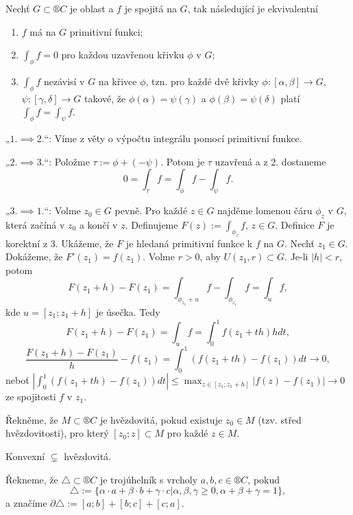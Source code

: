 \documentclass[12pt]{article}					%
\begin{document}
\begin{veta}
	Nechť $G \subset ®C$ je oblast a $f$ je spojitá na $G$, tak následující je ekvivalentní
	\begin{enumerate}
		\item $f$ má na $G$ primitivní funkci;
		\item $\int_\phi f = 0$ pro každou uzavřenou křivku $\phi$ v $G$;
		\item $\int_\phi f$ nezávisí v $G$ na křivce $\phi$, tzn. pro každé dvě křivky $\phi: [\alpha, \beta] \rightarrow G$, $\psi: [\gamma, \delta] \rightarrow G$ takové, že $\phi(\alpha) = \psi(\gamma)$ a $\phi(\beta) = \psi(\delta)$ platí $\int_\phi f = \int_\psi f$.
	\end{enumerate}

	\begin{dukazin}
		„$1. \implies 2.$“: Víme z věty o výpočtu integrálu pomocí primitivní funkce.

		„$2. \implies 3.$“: Položme $\tau := \phi + (- \psi)$. Potom je $\tau$ uzavřená a z 2. dostaneme
		$$ 0 = \int_\tau f = \int_\phi f - \int_\psi f. $$

		„$3. \implies 1.$“: Volme $z_0 \in G$ pevně. Pro každé $z \in G$ najděme lomenou čáru $\phi_z$ v $G$, která začíná v $z_0$ a končí v $z$. Definujeme $F(z) := \int_{\phi_z} f$, $z \in G$. Definice $F$ je korektní z 3. Ukážeme, že $F$ je hledaná primitivní funkce k $f$ na $G$. Nechť $z_1 \in G$. Dokážeme, že $F'(z_1) = f(z_1)$. Volme $r > 0$, aby $U(z_1, r) \subset G$. Je-li $|h| < r$, potom
		$$ F(z_1 + h) - F(z_1) = \int_{\phi_{z_1} + u} f - \int_{\phi_{z_1}} f = \int_u f, $$
		kde $u = [z_1; z_1 + h]$ je úsečka. Tedy
		$$ F(z_1 + h) - F(z_1) = \int_u f = \int_0^1 f(z_1 + th)h dt, $$
		$$ \frac{F(z_1 + h) - F(z_1)}{h} - f(z_1) = \int_0^1 (f(z_1 + th) - f(z_1))dt \rightarrow 0, $$
		neboť $\left|\int_0^1 (f(z_1 + th) - f(z_1))dt\right| ≤ \max_{z \in [z_1; z_1+h]} |f(z) - f(z_1)| \rightarrow 0$ ze spojitosti $f$ v $z_1$.
	\end{dukazin}
\end{veta}

\begin{poznamka}[Značení]
	Řekněme, že $M \subset ®C$ je hvězdovitá, pokud existuje $z_0 \in M$ (tzv. střed hvězdovitosti), pro který $[z_0; z] \subset M$ pro každé $z \in M$.

	\begin{poznamkain}
		Konvexní $\subsetneq$ hvězdovitá.
	\end{poznamkain}

	Řekneme, že $\triangle \subset ®C$ je trojúhelník s vrcholy $a, b, c \in ®C$, pokud
	$$ \triangle := \{\alpha·a + \beta·b + \gamma·c | \alpha, \beta, \gamma ≥ 0, \alpha + \beta + \gamma = 1\}, $$
	a značíme $\partial \triangle := [a; b] + [b; c] + [c; a]$.
\end{poznamka}
\end{document}
